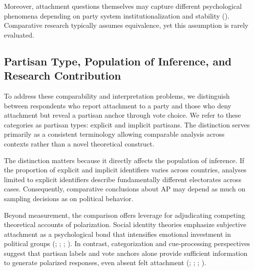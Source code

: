 \documentclass[
  12pt,
  a4paper,
  DIV=11,
  numbers=noendperiod]{scrartcl}
\begin{document}
Moreover, attachment questions themselves may capture different
psychological phenomena depending on party system institutionalization
and stability (). Comparative research typically assumes
equivalence, yet this assumption is rarely evaluated.

\subsection{Partisan Type, Population of Inference, and Research
Contribution}\label{sec-contribution}

To address these comparability and interpretation problems, we
distinguish between respondents who report attachment to a party and
those who deny attachment but reveal a partisan anchor through vote
choice. We refer to these categories as partisan types: explicit and
implicit partisans. The distinction serves primarily as a consistent
terminology allowing comparable analysis across contexts rather than a
novel theoretical construct.

The distinction matters because it directly affects the population of
inference. If the proportion of explicit and implicit identifiers varies
across countries, analyses limited to explicit identifiers describe
fundamentally different electorates across cases. Consequently,
comparative conclusions about AP may depend as much on sampling
decisions as on political behavior.

Beyond measurement, the comparison offers leverage for adjudicating
competing theoretical accounts of polarization. Social identity theories
emphasize subjective attachment as a psychological bond that intensifies
emotional investment in political groups
(; ;
;
). In
contrast, categorization and cue-processing perspectives suggest that
partisan labels and vote anchors alone provide sufficient information to
generate polarized responses, even absent felt attachment
(;
;
;
).
\end{document}
